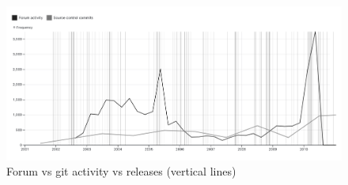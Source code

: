 \begin{figure}[!htbp] 
    \centering 
    \includegraphics[width=1\textwidth]{images/figure-forum-git-activity.png} 

    \caption{Forum vs git activity vs releases (vertical lines)}
    \label{figure:forum-git-activity}  
  \end{figure}